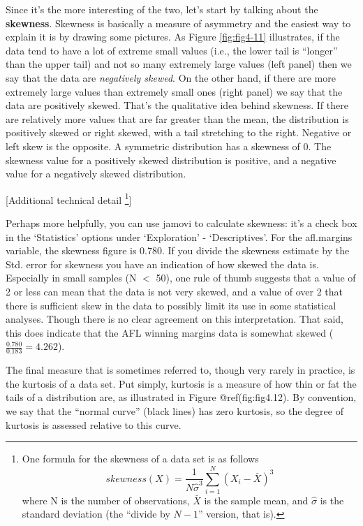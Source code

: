 \documentclass[
]{book}
\begin{document}
Since it's the more interesting of the two, let's start by talking about the \textbf{skewness}. Skewness is basically a measure of asymmetry and the easiest way to explain it is by drawing some pictures. As Figure \ref{fig:fig4-11} illustrates, if the data tend to have a lot of extreme small values (i.e., the lower tail is ``longer'' than the upper tail) and not so many extremely large values (left panel) then we say that the data are \emph{negatively skewed}. On the other hand, if there are more extremely large values than extremely small ones (right panel) we say that the data are positively skewed. That's the qualitative idea behind skewness. If there are relatively more values that are far greater than the mean, the distribution is positively skewed or right skewed, with a tail stretching to the right. Negative or left skew is the opposite. A symmetric distribution has a skewness of 0. The skewness value for a positively skewed distribution is positive, and a negative value for a negatively skewed distribution.

{{[}Additional technical detail \footnote{One formula for the skewness of a data set is as follows \[    skewness(X)=\frac{1}{N \hat{\sigma}^3} \sum_{i=1}^{N} ( X_i - \bar{X})^3\] where N is the number of observations, \(\bar{X}\) is the sample mean, and \(\hat{\sigma}\) is the standard deviation (the ``divide by \(N - 1\)'' version, that is).}{]}}

Perhaps more helpfully, you can use jamovi to calculate skewness: it's a check box in the `Statistics' options under `Exploration' - `Descriptives'. For the afl.margins variable, the skewness figure is \(0.780\). If you divide the skewness estimate by the Std. error for skewness you have an indication of how skewed the data is. Especially in small samples (N \(<\) 50), one rule of thumb suggests that a value of 2 or less can mean that the data is not very skewed, and a value of over 2 that there is sufficient skew in the data to possibly limit its use in some statistical analyses. Though there is no clear agreement on this interpretation. That said, this does indicate that the AFL winning margins data is somewhat skewed (\(\frac{0.780}{0.183} = 4.262\)).

The final measure that is sometimes referred to, though very rarely in practice, is the kurtosis of a data set. Put simply, kurtosis is a measure of how thin or fat the tails of a distribution are, as illustrated in Figure @ref(fig:fig4.12). By convention, we say that the ``normal curve'' (black lines) has zero kurtosis, so the degree of kurtosis is assessed relative to this curve.
\end{document}
